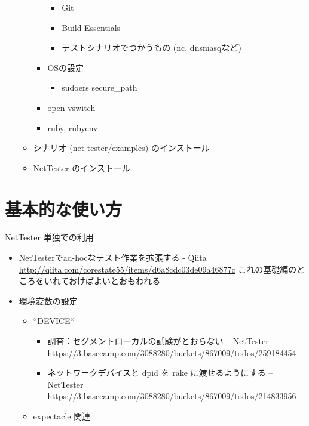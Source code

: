 \begin{itemize}
\begin{itemize}
\begin{itemize}
\begin{itemize}
                      \item Git
                      \item Build-Essentials
                      \item テストシナリオでつかうもの (nc, dnsmasqなど)
                     \end{itemize}
               \item OSの設定
                     \begin{itemize}
                      \item sudoers secure\_path
                     \end{itemize}
               \item open vswitch
               \item ruby, rubyenv
              \end{itemize}
        \item シナリオ (net-tester/examples) のインストール
        \item NetTester のインストール
       \end{itemize}
\end{itemize}

\section{基本的な使い方}

NetTester 単独での利用
\begin{itemize}
 \item NetTesterでad-hocなテスト作業を拡張する - Qiita \url{http://qiita.com/corestate55/items/d6a8cdc03de09a46877c}
       これの基礎編のところをいれておけばよいとおもわれる
 \item 環境変数の設定
       \begin{itemize}
        \item ``DEVICE``
              \begin{itemize}
               \item 調査：セグメントローカルの試験がとおらない – NetTester \url{https://3.basecamp.com/3088280/buckets/867009/todos/259184454}
               \item ネットワークデバイスと dpid を rake に渡せるようにする – NetTester \url{https://3.basecamp.com/3088280/buckets/867009/todos/214833956}
              \end{itemize}
        \item expectacle 関連
       \end{itemize}
\end{itemize}

